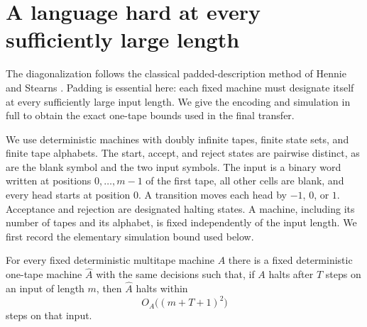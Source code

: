\section{A language hard at every sufficiently large length}
\label{diag:section}

The diagonalization follows the classical padded-description method of
Hennie and Stearns \cite[Section~6, Theorem~7]{HennieStearns1966}.
Padding is essential here: each fixed machine must designate itself at
every sufficiently large input length. We give the encoding and simulation
in full to obtain the exact one-tape bounds used in the final transfer.

We use deterministic machines with doubly infinite tapes, finite state sets,
and finite tape alphabets.  The start, accept, and reject states are pairwise
distinct, as are the blank symbol and the two input symbols.  The input is
a binary word written at positions
$0,\ldots,m-1$ of the first tape, all other cells are blank, and every head
starts at position $0$.  A transition moves each head by $-1$, $0$, or $1$.
Acceptance and rejection are designated halting states.  A machine, including
its number of tapes and its alphabet, is fixed independently of the input
length.  We first record the elementary simulation bound used below.

\begin{lemma}
\label{diag:simulation}
For every fixed deterministic multitape machine $A$ there is a fixed
deterministic one-tape machine $\widehat A$ with the same decisions such that,
if $A$ halts after $T$ steps on an input of length $m$, then $\widehat A$
halts within
\[
                    O_A\bigl((m+T+1)^2\bigr)
\]
steps on that input.
\end{lemma}

